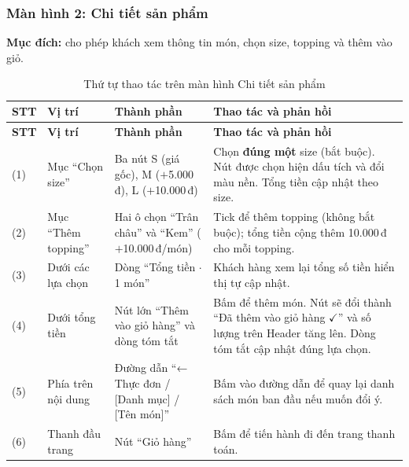 \subsubsection{Màn hình 2: Chi tiết sản phẩm}
\label{subsec:wf-chitiet}
\textbf{Mục đích:} cho phép khách xem thông tin món, chọn size, topping và thêm vào giỏ.

\begin{minipage}{\textwidth}
\centering
{}
\label{fig:wf-chitiet}
\end{minipage}
\vspace{10pt}

\begin{longtable}{|p{1.0cm}|p{2.5cm}|p{4.5cm}|p{5.5cm}|}
  \caption{Thứ tự thao tác trên màn hình Chi tiết sản phẩm}\label{tab:wf-chitiet}\\
  \hline
  \textbf{STT} & \textbf{Vị trí} & \textbf{Thành phần} & \textbf{Thao tác và phản hồi} \\
  \hline
  \endfirsthead
  \hline
  \textbf{STT} & \textbf{Vị trí} & \textbf{Thành phần} & \textbf{Thao tác và phản hồi} \\
  \hline
  \endhead
  (1) & Mục ``Chọn size'' & Ba nút S (giá gốc), M ($+$5.000\,đ), L ($+$10.000\,đ) & Chọn \textbf{đúng một} size (bắt buộc). Nút được chọn hiện dấu tích và đổi màu nền. Tổng tiền cập nhật theo size. \\
  \hline
  (2) & Mục ``Thêm topping'' & Hai ô chọn ``Trân châu'' và ``Kem'' ($+$10.000\,đ/món) & Tick để thêm topping (không bắt buộc); tổng tiền cộng thêm 10.000\,đ cho mỗi topping. \\
  \hline
  (3) & Dưới các lựa chọn & Dòng ``Tổng tiền $\cdot$ 1 món'' & Khách hàng xem lại tổng số tiền hiển thị tự cập nhật. \\
  \hline
  (4) & Dưới tổng tiền & Nút lớn ``Thêm vào giỏ hàng'' và dòng tóm tắt & Bấm để thêm món. Nút sẽ đổi thành ``Đã thêm vào giỏ hàng $\checkmark$'' và số lượng trên Header tăng lên. Dòng tóm tắt cập nhật đúng lựa chọn. \\
  \hline
  (5) & Phía trên nội dung & Đường dẫn ``← Thực đơn / [Danh mục] / [Tên món]'' & Bấm vào đường dẫn để quay lại danh sách món ban đầu nếu muốn đổi ý. \\
  \hline
  (6) & Thanh đầu trang & Nút ``Giỏ hàng'' & Bấm để tiến hành đi đến trang thanh toán. \\
  \hline
\end{longtable}

